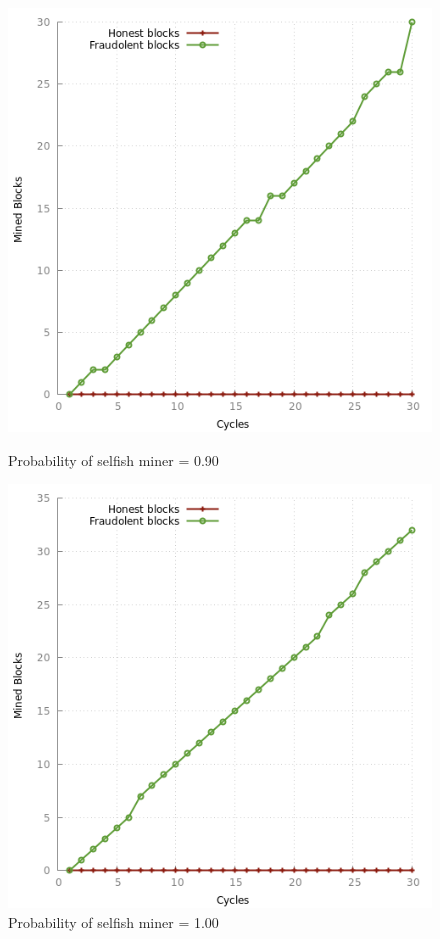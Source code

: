 \documentclass{article}
\begin{document}
\begin{figure}[!htb]
  \includegraphics[width=\linewidth]{plots/blockchain_P0.90.png}
  \caption{Probability of selfish miner = 0.90}\label{fig:bk0.90}
\endminipage\hfill
{}
  \includegraphics[width=\linewidth]{plots/blockchain_P1.00}
  \caption{Probability of selfish miner = 1.00}\label{fig:bk1.00}
\endminipage\hfill
\end{figure}
\end{document}
